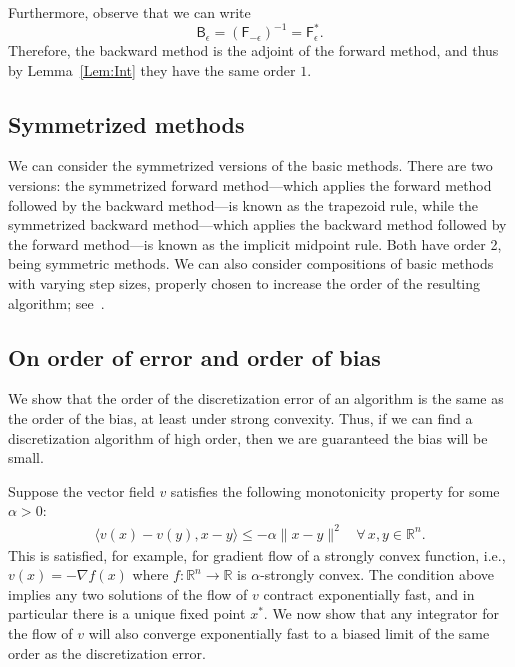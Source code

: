 \documentclass[final,12pt]{colt2018}
\newcommand{\R}{\mathbb{R}}
\newcommand{\F}{\mathsf{F}}
\newcommand{\B}{\mathsf{B}}
\begin{document}
Furthermore, observe that we can write
$$\B_\epsilon = (\F_{-\epsilon})^{-1} = \F_\epsilon^\ast.$$
Therefore, the backward method is the adjoint of the forward method, and thus by Lemma~\ref{Lem:Int} they have the same order $1$.


\subsection{Symmetrized methods}

We can consider the symmetrized versions of the basic methods.
There are two versions: the symmetrized forward method---which applies the forward method followed by the backward method---is known as the trapezoid rule, while the symmetrized backward method---which applies the backward method followed by the forward method---is known as the implicit midpoint rule.
Both have order 2, being symmetric methods.
We can also consider compositions of basic methods with varying step sizes, properly chosen to increase the order of the resulting algorithm; see~\cite[$\S$II.II.4]{HLW06}.


\subsection{On order of error and order of bias}
\label{App:DiscOrder}

We show that the order of the discretization error of an algorithm is the same as the order of the bias, at least under strong convexity.
Thus, if we can find a discretization algorithm of high order, then we are guaranteed the bias will be small.

Suppose the vector field $v$ satisfies the following monotonicity property for some $\alpha > 0$:
\begin{align}\label{Eq:vCont}
\langle v(x)-v(y) , x-y \rangle \le -\alpha \|x-y\|^2~~~~\forall \, x,y \in \R^n.
\end{align}
This is satisfied, for example, for gradient flow of a strongly convex function, i.e., $v(x) = -\nabla f(x)$ where $f \colon \R^n \to \R$ is $\alpha$-strongly convex.
The condition above implies any two solutions of the flow of $v$ contract exponentially fast, and in particular there is a unique fixed point $x^\ast$.
We now show that any integrator for the flow of $v$ will also converge exponentially fast to a biased limit of the same order as the discretization error.
\end{document}
